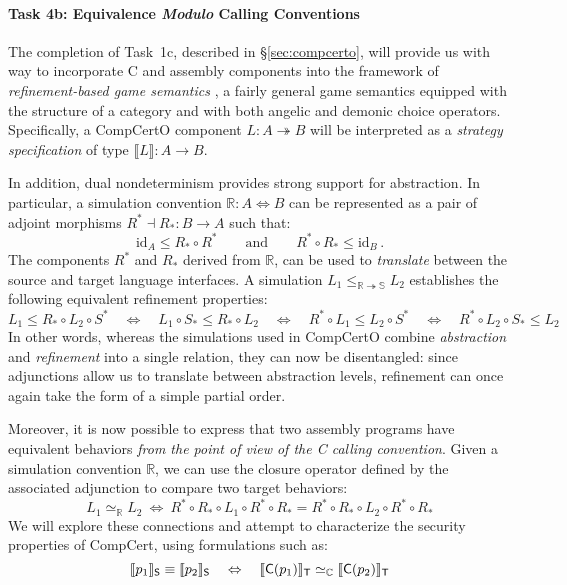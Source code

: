 \vspace*{-2ex}
\paragraph*{Task 4b: Equivalence \emph{Modulo} Calling Conventions}




The completion of Task~1c, described in \S\ref{sec:compcerto},
will provide us with way to incorporate C and assembly components
into the framework of \emph{refinement-based game semantics} \cite{koenig20},
a fairly general game semantics
equipped with the structure of a category
and with both angelic and demonic choice operators.
Specifically,
a CompCertO component $L : A \twoheadrightarrow B$
will be interpreted as a \emph{strategy specification} of type
$\llbracket L \rrbracket : A \rightarrow B$.

In addition, dual nondeterminism provides strong support for abstraction.
In particular,
a simulation convention $\mathbb{R} : A \Leftrightarrow B$
can be represented as a pair of adjoint morphisms
$R^* \dashv R_* : B \rightarrow A$
such that:
\[
  \mathrm{id}_A \le R_* \circ R^*
  \qquad \text{and} \qquad
  R^* \circ R_* \le \mathrm{id}_B
  \,.
\]
The components $R^*$ and $R_*$
derived from $\mathbb{R}$,
can be used
to \emph{translate} between the source and target language interfaces.
A simulation $L_1 \le_{\mathbb{R} \twoheadrightarrow \mathbb{S}} L_2$
establishes the following equivalent refinement properties:
\[
  L_1 \le R_* \circ L_2 \circ S^* \quad \Leftrightarrow \quad
  L_1 \circ S_* \le R_* \circ L_2 \quad \Leftrightarrow \quad
  R^* \circ L_1 \le L_2 \circ S^* \quad \Leftrightarrow \quad
  R^* \circ L_2 \circ S_* \le L_2
\]
In other words,
whereas the simulations used in CompCertO
combine \emph{abstraction} and \emph{refinement}
into a single relation,
they can now be disentangled:
since adjunctions allow us to translate between abstraction levels,
refinement can once again take the form of a simple partial order.

Moreover,
it is now possible to express that two assembly programs
have equivalent behaviors
\emph{from the point of view of the C calling convention}.
Given a simulation convention $\mathbb{R}$,
we can use the closure operator defined by the associated adjunction
to compare two target behaviors:
\[
  L_1 \simeq_\mathbb{R} L_2 \: \Leftrightarrow \:
  R^* \circ R_* \circ L_1 \circ R^* \circ R_* =
  R^* \circ R_* \circ L_2 \circ R^* \circ R_*
\]
We will explore these connections and attempt to characterize
the security properties of CompCert,
using formulations such as:
\[
  \llbracket p_1 \rrbracket_{ \mathsf{S} } \equiv
  \llbracket p_2 \rrbracket_{ \mathsf{S} }
  \quad \Leftrightarrow \quad
  \llbracket  \mathsf{C} (p_1) \rrbracket_{ \mathsf{T} } \simeq_\mathbb{C}
  \llbracket  \mathsf{C} (p_2) \rrbracket_{ \mathsf{T} }
\]

